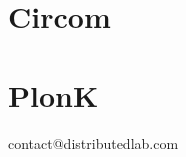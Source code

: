\documentclass{zkdl-template-105x135-nohead}
\begin{document}
    

    \section{Circom} \label{section:circom}

     

    \section{PlonK} \label{section:plonk}

    


    \newpage
    \pagestyle{empty}
    
    \ifodd\value{page}
        \newpage
    \fi
    
    \vspace*{\fill}
    
    \begin{center}
        contact@distributedlab.com
    \end{center}
    
    \vspace*{\fill}
\end{document}
